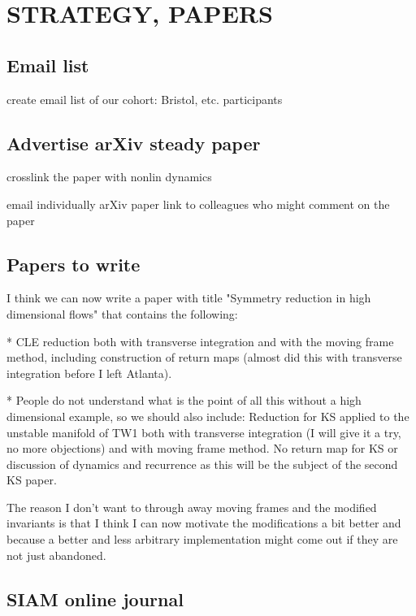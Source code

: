 
\section{STRATEGY, PAPERS}

\subsection{Email list}

create email list of our cohort:  Bristol, etc. participants

\subsection{Advertise arXiv steady paper}

crosslink the paper with nonlin dynamics

email individually arXiv paper link to colleagues who might comment
    on the paper



\subsection{Papers to write}

\medskip{}
I think we can now write a paper with title "Symmetry
reduction in high dimensional flows" that contains the
following:

* CLE reduction both with transverse integration and with the
moving frame method, including construction of return maps
(almost did this with transverse integration before I left
Atlanta).

* People do not understand what is the point of all this
without a high dimensional example, so we should also
include: Reduction for KS applied to the unstable manifold of
TW1 both with transverse integration (I will give it a try,
no more objections) and with moving frame method. No return
map for KS or discussion of dynamics and recurrence as this
will be the subject of the second KS paper.

The reason I don't want to through away moving frames and the
modified invariants is that I think I can now motivate the
modifications a bit better and because a better and less
arbitrary implementation might come out if they are not just
abandoned.

\subsection{SIAM online journal}

